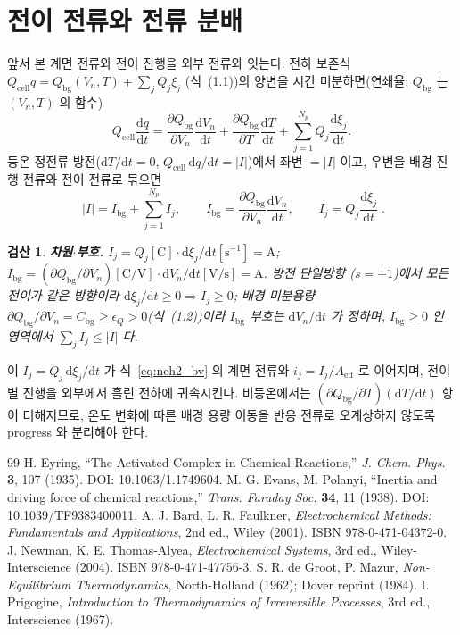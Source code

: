\documentclass[11pt,a4paper]{article}
\newtheorem*{verifybox}{검산}
\newcommand{\dd}{\mathrm{d}}
\newcommand{\eff}{\mathrm{eff}}
\newcommand{\cell}{\mathrm{cell}}
\newcommand{\bg}{\mathrm{bg}}
\begin{document}
\section{전이 전류와 전류 분배}\label{sec:nch2_current}
앞서 본 계면 전류와 전이 진행을 외부 전류와 잇는다. 전하 보존식 $Q_\cell q=Q_\bg(V_n,T)+\sum_j Q_j\xi_j$
(식~(1.1))의 양변을 시간 미분하면(연쇄율; $Q_\bg$ 는 $(V_n,T)$ 의 함수)
\begin{equation}
Q_\cell\frac{\dd q}{\dd t}=\frac{\partial Q_\bg}{\partial V_n}\frac{\dd V_n}{\dd t}
+\frac{\partial Q_\bg}{\partial T}\frac{\dd T}{\dd t}+\sum_{j=1}^{N_p} Q_j\frac{\dd\xi_j}{\dd t}.
\label{eq:nch2_balance_dt}
\end{equation}
등온 정전류 방전($\dd T/\dd t=0$, $Q_\cell\,\dd q/\dd t=|I|$)에서 좌변 $=|I|$ 이고, 우변을 배경 진행 전류와 전이
전류로 묶으면
\begin{equation}
\boxed{\;|I|=I_\bg+\sum_{j=1}^{N_p}I_j,\qquad I_\bg=\frac{\partial Q_\bg}{\partial V_n}\frac{\dd V_n}{\dd t},\qquad
I_j=Q_j\frac{\dd\xi_j}{\dd t}\;.}
\label{eq:nch2_current}
\end{equation}
\begin{verifybox}
\textbf{차원$\cdot$부호.} $I_j=Q_j[\mathrm C]\cdot\dd\xi_j/\dd t[\mathrm{s^{-1}}]=\mathrm A$;
$I_\bg=(\partial Q_\bg/\partial V_n)[\mathrm{C/V}]\cdot\dd V_n/\dd t[\mathrm{V/s}]=\mathrm A$. 방전 단일방향
($s=+1$)에서 모든 전이가 같은 방향이라 $\dd\xi_j/\dd t\ge0\Rightarrow I_j\ge0$; 배경 미분용량
$\partial Q_\bg/\partial V_n=C_\bg\ge\epsilon_Q>0$(식~(1.2))이라 $I_\bg$ 부호는 $\dd V_n/\dd t$ 가 정하며,
$I_\bg\ge0$ 인 영역에서 $\sum_j I_j\le|I|$ 다.
\end{verifybox}
이 $I_j=Q_j\,\dd\xi_j/\dd t$ 가 식~\eqref{eq:nch2_bv} 의 계면 전류와 $i_j=I_j/A_\eff$ 로 이어지며, 전이별
진행을 외부에서 흘린 전하에 귀속시킨다. 비등온에서는 $(\partial Q_\bg/\partial T)(\dd T/\dd t)$ 항이 더해지므로,
온도 변화에 따른 배경 용량 이동을 반응 전류로 오계상하지 않도록 progress 와 분리해야 한다.

\begin{thebibliography}{99}
 H. Eyring, ``The Activated Complex in Chemical Reactions,'' \emph{J. Chem. Phys.} \textbf{3}, 107 (1935). DOI: 10.1063/1.1749604.
 M. G. Evans, M. Polanyi, ``Inertia and driving force of chemical reactions,'' \emph{Trans. Faraday Soc.} \textbf{34}, 11 (1938). DOI: 10.1039/TF9383400011.
 A. J. Bard, L. R. Faulkner, \emph{Electrochemical Methods: Fundamentals and Applications}, 2nd ed., Wiley (2001). ISBN 978-0-471-04372-0.
 J. Newman, K. E. Thomas-Alyea, \emph{Electrochemical Systems}, 3rd ed., Wiley-Interscience (2004). ISBN 978-0-471-47756-3.
 S. R. de Groot, P. Mazur, \emph{Non-Equilibrium Thermodynamics}, North-Holland (1962); Dover reprint (1984).
 I. Prigogine, \emph{Introduction to Thermodynamics of Irreversible Processes}, 3rd ed., Interscience (1967).
\end{thebibliography}
\end{document}

